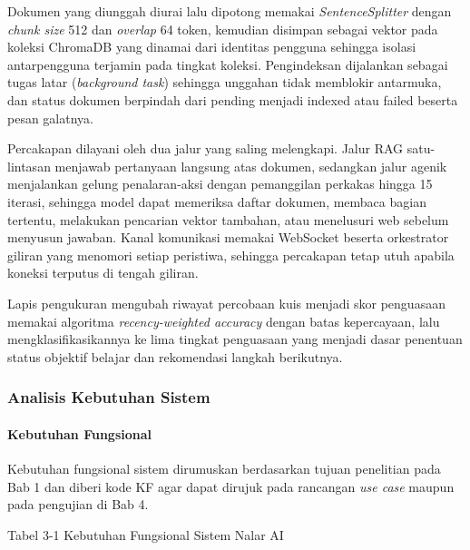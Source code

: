 \documentclass[12pt,a4paper]{article}
\begin{document}
Dokumen yang diunggah diurai lalu dipotong memakai \textit{SentenceSplitter} dengan \textit{chunk size} 512 dan \textit{overlap} 64 token, kemudian disimpan sebagai vektor pada koleksi ChromaDB yang dinamai dari identitas pengguna sehingga isolasi antarpengguna terjamin pada tingkat koleksi. Pengindeksan dijalankan sebagai tugas latar (\textit{background task}) sehingga unggahan tidak memblokir antarmuka, dan status dokumen berpindah dari pending menjadi indexed atau failed beserta pesan galatnya.

Percakapan dilayani oleh dua jalur yang saling melengkapi. Jalur RAG satu-lintasan menjawab pertanyaan langsung atas dokumen, sedangkan jalur agenik menjalankan gelung penalaran-aksi dengan pemanggilan perkakas hingga 15 iterasi, sehingga model dapat memeriksa daftar dokumen, membaca bagian tertentu, melakukan pencarian vektor tambahan, atau menelusuri web sebelum menyusun jawaban. Kanal komunikasi memakai WebSocket beserta orkestrator giliran yang menomori setiap peristiwa, sehingga percakapan tetap utuh apabila koneksi terputus di tengah giliran.

Lapis pengukuran mengubah riwayat percobaan kuis menjadi skor penguasaan memakai algoritma \textit{recency-weighted accuracy} dengan batas kepercayaan, lalu mengklasifikasikannya ke lima tingkat penguasaan yang menjadi dasar penentuan status objektif belajar dan rekomendasi langkah berikutnya.

\subsubsection*{Analisis Kebutuhan Sistem}
\paragraph*{Kebutuhan Fungsional}
Kebutuhan fungsional sistem dirumuskan berdasarkan tujuan penelitian pada Bab 1 dan diberi kode KF agar dapat dirujuk pada rancangan \textit{use case} maupun pada pengujian di Bab 4.

Tabel 3-1	Kebutuhan Fungsional Sistem Nalar AI
\end{document}
